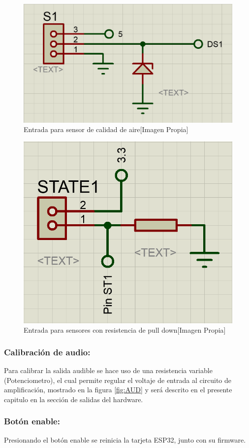 		\begin{figure}[H]
			\centering
			\caption{Entrada para sensor de calidad de aire[Imagen Propia]}
			\label{fig:S1Aire}
			\includegraphics[width=0.6\linewidth]{Imagenes/S1Aire}
		\end{figure}
	
		\begin{figure}[H]
			\centering
			\caption{Entrada para sensores con resistencia de pull down[Imagen Propia]}
			\label{fig:ST}
			\includegraphics[width=0.5\linewidth]{Imagenes/ST}
		\end{figure}		
	
	\subsubsection{Calibración de audio:}
		Para calibrar la salida audible se hace uso de una resistencia variable (Potenciometro), el cual permite regular el voltaje de entrada al circuito de amplificación, mostrado en la figura \ref{fig:AUD} y será descrito en el presente capitulo en la sección de salidas del hardware.\\
		
	\subsubsection{Botón enable:}
		Presionando el botón enable se reinicia la tarjeta ESP32, junto con su firmware.\\
		
